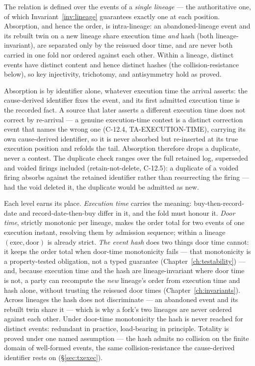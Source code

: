 \documentclass[11pt,a4paper]{article}
\begin{document}
The relation is defined over the events of a \emph{single lineage} --- the authoritative one,
of which Invariant~\ref{inv:lineage} guarantees exactly one at each position. Absorption, and
hence the order, is intra-lineage: an abandoned-lineage event and its rebuilt twin on a new
lineage share execution time \emph{and} hash (both lineage-invariant), are separated only by
the reissued door time, and are never both carried in one fold nor ordered against each other.
Within a lineage, distinct events have distinct content and hence distinct hashes (the
collision-resistance below), so key injectivity, trichotomy, and antisymmetry hold as proved.

Absorption is by identifier alone, whatever execution time the arrival asserts: the
cause-derived identifier fixes the event, and its first admitted execution time is the recorded
fact. A source that later asserts a different execution time does not correct by re-arrival ---
a genuine execution-time contest is a distinct correction event that names the wrong one
(C-12.4, TA-EXECUTION-TIME), carrying its own cause-derived identifier, so it is never absorbed
but re-inserted at its true execution position and refolds the tail. Absorption therefore drops
a duplicate, never a contest. The duplicate check ranges over the full retained log, superseded
and voided firings included (retain-not-delete, C-12.5): a duplicate of a voided firing absorbs
against the retained identifier rather than resurrecting the firing --- had the void deleted it,
the duplicate would be admitted as new.

Each level earns its place. \emph{Execution time} carries the meaning: buy-then-record-date
and record-date-then-buy differ in it, and the fold must honour it. \emph{Door time}, strictly
monotonic per lineage, makes the order total for two events of one execution instant, resolving
them by admission sequence; within a lineage $(\text{exec},\text{door})$ is already strict.
\emph{The event hash} does two things door time cannot: it keeps the order total when door-time
monotonicity fails --- that monotonicity is a property-tested obligation, not a typed guarantee
(Chapter~\ref{ch:testability}) --- and, because execution time and the hash are lineage-invariant
where door time is not, a party can recompute the \emph{new} lineage's order from execution time
and hash alone, without trusting the reissued door times (Chapter~\ref{ch:invariants}). Across
lineages the hash does not discriminate --- an abandoned event and its rebuilt twin share it ---
which is why a fork's two lineages are never ordered against each other. Under door-time
monotonicity the hash is never reached for distinct events: redundant in practice, load-bearing
in principle. Totality is proved under one named assumption --- the hash admits no collision on
the finite domain of well-formed events, the same collision-resistance the cause-derived
identifier rests on (\S\ref{sec:txexec}).
\end{document}
